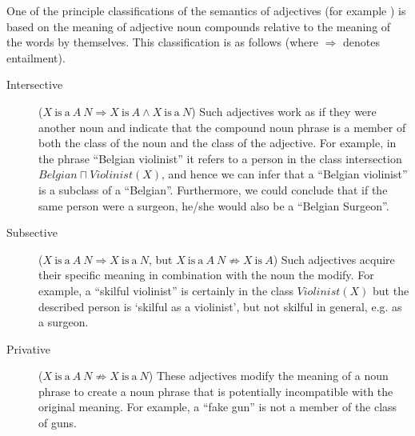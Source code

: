 \documentclass[11pt]{article}
\begin{document}
One of the principle classifications of the semantics of adjectives (for example \cite{partee2003there,bouillon1999description,morzycki2013modification}) is based on the meaning of adjective noun compounds relative to the meaning of the words by themselves. This classification is as follows (where $\Rightarrow$ denotes entailment).

\begin{description}
\item[Intersective] ($X\mathrm{~is~a~}A~N \Rightarrow X\mathrm{~is~}A \wedge  X\mathrm{~is~a~}N$) 
Such adjectives work as if they were another noun and indicate that the compound 
noun phrase is a member of both the class of the noun and the class of the 
adjective. For example, in the phrase ``Belgian violinist'' it refers to a 
person in the class intersection $Belgian \sqcap Violinist(X)$, and hence we 
can infer that a ``Belgian violinist'' is a subclass of a ``Belgian''.  Furthermore,
we could conclude that if the same person were a surgeon, he/she would also
be a ``Belgian Surgeon''.

\item[Subsective] ($X\mathrm{~is~a~}A~N \Rightarrow X\mathrm{~is~a~}N$, but $X\mathrm{~is~a~}A~N \not\Rightarrow X\mathrm{~is~}A$) Such adjectives acquire their specific meaning in combination with the noun the modify. For example, a ``skilful 
violinist'' is certainly in the class $Violinist(X)$ but the described person is `skilful as a violinist', but not skilful in general, e.g. as a surgeon.

\item[Privative] ($X\mathrm{~is~a~}A~N \not\Rightarrow X\mathrm{~is~a~}N$) 
These adjectives modify the meaning of a noun phrase to create a noun phrase 
that is potentially incompatible with the original meaning. For example, a 
``fake gun'' is not a member of the class of guns.
\end{description}

%
%
\end{document}
